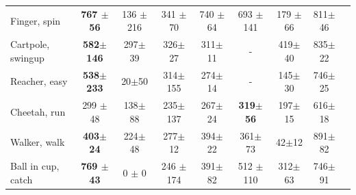 \begin{table}[ht]
\begin{center}
\begin{small}
\begin{sc}
\begin{tabular}{lcccccccc}
\midrule
Finger, spin    &  \textbf{767 $\pm$ 56 } & 136 $\pm$ 216 & 341 $\pm$ 70& 740 $\pm$ 64 &  693 $\pm$ 141 & 179 $\pm$ 66 &  811$\pm$46 \\
Cartpole, swingup & \textbf{582$\pm$146}& 297$\pm$39& 326$\pm$27 & 311$\pm$11 & - & 419$\pm$40 & 835$\pm$22\\
Reacher, easy    & \textbf{538$\pm$233} & 20$\pm$50 & 314$\pm$155 & 274$\pm$14 & - & 145$\pm$30 & 746$\pm$25 \\
Cheetah, run   & 299 $\pm$48 & 138$\pm$88& 235$\pm$ 137 & 267$\pm$24 &  \textbf{319$\pm$56} & 197$\pm$15& 616$\pm$18 \\
Walker, walk      & \textbf{403$\pm$24}&  224$\pm$48& 277$\pm$12 & 394$\pm$22 & 361$\pm$73 &42$\pm$12& 891$\pm$82 \\
Ball in cup, catch  & \textbf{769 $\pm$ 43} & 0 $\pm$  0 & 246 $\pm$ 174 & 391$\pm$ 82 & 512 $\pm$ 110 & 312$\pm$ 63 & 746$\pm$91 \\ 
\bottomrule
\end{tabular}
\end{sc}
\end{small}
\end{center}
\vskip -0.1in
\end{table}


